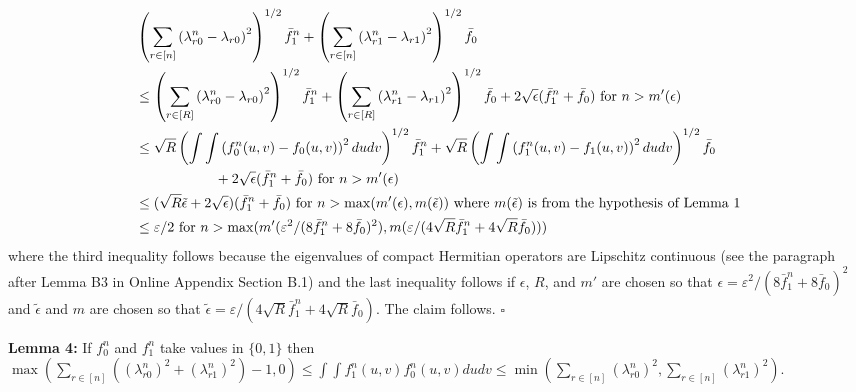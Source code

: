\documentclass[12pt]{article}
\theoremstyle{definition}
\begin{document}
\begin{flushleft}
\begin{align*}
&\left(\sum_{r \in [n]}\left(\lambda^{n}_{r0}-\lambda_{r0}\right)^{2}\right)^{1/2}\bar{f}^{n}_{1} + \left(\sum_{r \in [n]}\left(\lambda^{n}_{r1}-\lambda_{r1}\right)^{2}\right)^{1/2}\bar{f}_{0}\\
&\leq \left(\sum_{r \in [R]}\left(\lambda^{n}_{r0}-\lambda_{r0}\right)^{2}\right)^{1/2}\bar{f}^{n}_{1} + \left(\sum_{r \in [R]}\left(\lambda^{n}_{r1}-\lambda_{r1}\right)^{2}\right)^{1/2}\bar{f}_{0} + 2\sqrt{\epsilon}(\bar{f}^{n}_{1}+\bar{f}_{0}) \text{ for $n > m'(\epsilon)$}  \\
&\leq \sqrt{R} \left(\int\int\left(f^{n}_{0}(u,v) - f_{0}(u,v)\right)^{2}dudv \right)^{1/2}\bar{f}^{n}_{1} + \sqrt{R} \left(\int\int\left(f^{n}_{1}(u,v) - f_{1}(u,v)\right)^{2}dudv \right)^{1/2}\bar{f}_{0}  \\
&\hspace{20mm}+ 2\sqrt{\epsilon}(\bar{f}^{n}_{1}+\bar{f}_{0}) \text{ for $n > m'(\epsilon)$} \\
&\leq (\sqrt{R}\tilde{\epsilon} + 2\sqrt{\epsilon}) (\bar{f}^{n}_{1} + \bar{f}_{0}) \text{ for $n > \max(m'(\epsilon),m(\tilde{\epsilon}))$ where $m(\tilde{\epsilon})$ is from the hypothesis of Lemma 1}\\
&\leq  \varepsilon/2 \text{ for $n > \max(m'(\varepsilon^{2}/(8\bar{f}^{n}_{1} + 8\bar{f}_{0})^{2}),m( \varepsilon /(4\sqrt{R}\bar{f}^{n}_{1} + 4\sqrt{R}\bar{f}_{0}) ))$}
\end{align*}
where the third inequality follows because the eigenvalues of compact Hermitian operators are Lipschitz continuous (see the paragraph after Lemma B3 in Online Appendix Section B.1) and the last inequality follows if $\epsilon$, $R$, and $m'$ are chosen so that $\epsilon = \varepsilon^{2}/(8\bar{f}^{n}_{1} + 8\bar{f}_{0})^{2}$ and $\tilde{\epsilon}$ and $m$ are chosen so that $\tilde{\epsilon} = \varepsilon /(4\sqrt{R}\bar{f}^{n}_{1} + 4\sqrt{R}\bar{f}_{0}) $. The claim follows.  $\square$
\end{flushleft}


\begin{flushleft}
\textbf{Lemma 4:}  If $f_{0}^{n}$ and $f_{1}^{n}$ take values in $\{0,1\}$ then $\max\left(\sum_{r \in [n]}\left((\lambda_{r0}^{n})^{2}+(\lambda_{r1}^{n})^{2}\right) - 1,0\right) \leq  \int\int f^{n}_{1}(u,v)f^{n}_{0}(u,v)dudv \leq \min\left(\sum_{r \in [n]}(\lambda_{r0}^{n})^{2},\sum_{r \in [n]}(\lambda_{r1}^{n})^{2}\right)$.
\end{flushleft}
\end{document}
